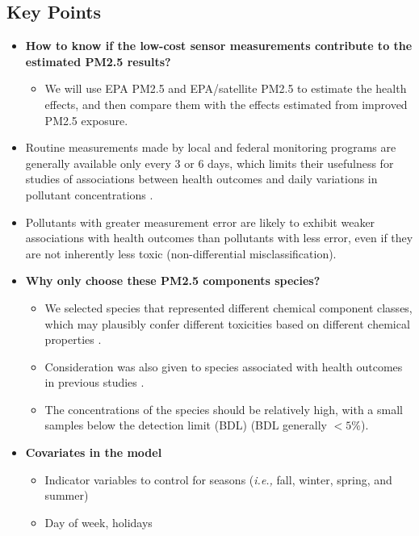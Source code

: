 \documentclass{article}
\begin{document}
\subsection{Key Points}
\begin{itemize}
    \item \textbf{How to know if the low-cost sensor measurements contribute to the estimated PM2.5 results?}{
        \begin{itemize}
            \item We will use EPA PM2.5 and EPA/satellite PM2.5 to estimate the health effects, and then compare them with the effects estimated from improved PM2.5 exposure.
        \end{itemize}
    }
    \item Routine measurements made by local and federal monitoring programs are generally available only every 3 or 6 days, which limits their usefulness for studies of associations between health outcomes and daily variations in pollutant concentrations \citep{sarnat2015fine}.
    \item Pollutants with greater measurement error are likely to exhibit weaker associations with health outcomes than pollutants with less error, even if they are not inherently less toxic (non-differential misclassification).
    \item \textbf{Why only choose these PM2.5 components species?} {
        \begin{itemize}
            \item We selected species that represented different chemical component classes, which may plausibly confer different toxicities based on different chemical properties \citep{suh2011chemical}. 
            \item Consideration was also given to species associated with health outcomes in previous studies \citep{chen2009effects, kelly2012size, rohr2012attributing}.
            \item The concentrations of the species should be relatively high, with a small samples below the detection limit (BDL) (BDL generally $<5\%$).
        \end{itemize}
    }
    \item \textbf{Covariates in the model} {
        \begin{itemize}
            \item Indicator variables to control for seasons (\textit{i.e.,} fall, winter, spring, and summer)
            \item Day of week, holidays

\end{itemize}}
\end{itemize}
\end{document}
